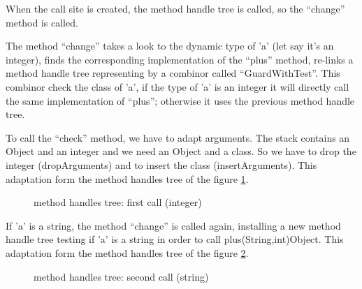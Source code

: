 \documentclass{sigplanconf}
\def \VM{VM\xspace}
\begin{document}
        When the call site is created, the method handle tree is called, so the ``change'' method is called.

        

        The method “change” takes a look to the dynamic type of ’a’ (let say it’s an integer),
        ﬁnds the corresponding implementation of the ``plus'' method,
        re-links a method handle tree representing by a combinor called ``GuardWithTest''.
        This combinor check the class of 'a',
        if the type of ’a’ is an integer it will directly call the same implementation of ``plus'';
        otherwise it uses the previous method handle tree.

        To call the ``check'' method, we have to adapt arguments.
        The stack contains an Object and an integer and we need an Object and a class.
        So we have to drop the integer (dropArguments) and to insert the class (insertArguments).
        This adaptation form the method handles tree of the figure \ref{ast2}.

        \begin{figure}[!h]
          \centering \resizebox{\linewidth}{!}{}
          \caption{method handles tree: first call (integer)}
          \label{ast2}
        \end{figure}

        If ’a’ is a string, the method ``change'' is called again,
        installing a new method handle tree testing if ’a’ is a string in order to call plus(String,int)Object.
        This adaptation form the method handles tree of the figure \ref{ast3}.

        \begin{figure}
          \centering \resizebox{.8\linewidth}{!}{}
          \caption{method handles tree: second call (string)}
          \label{ast3}
        \end{figure}


\end{document}
